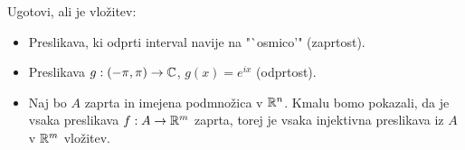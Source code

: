 \begin{primer}
    Ugotovi, ali je vložitev:
    \begin{itemize}
        \item Preslikava, ki odprti interval navije na "`osmico'" (zaprtost).
        \item Preslikava $g: (-\pi, \pi) \to \mathbb{C}$, $g(x) = e^{ix}$ (odprtost).
        \item Naj bo $A$ zaprta in imejena podmnožica v $\mathbb{R}^n$. Kmalu bomo pokazali, da je vsaka preslikava $f: A \to \mathbb{R}^m$ zaprta, torej je vsaka injektivna preslikava iz $A$ v $\mathbb{R}^m$ vložitev.
    \end{itemize}
\end{primer}